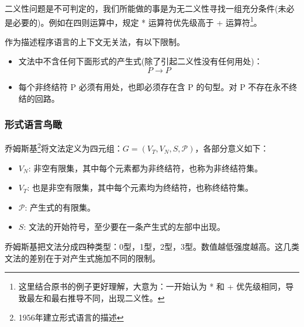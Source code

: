 二义性问题是不可判定的，我们所能做的事是为无二义性寻找一组充分条件(未必是必要的)。例如在四则运算中，规定 * 运算符优先级高于 + 运算符\footnote{这里结合原书的例子更好理解，大意为：一开始认为 * 和 + 优先级相同，导致最左和最右推导不同，出现二义性。}。

作为描述程序语言的上下文无关法，有以下限制。

\begin{itemize}
	\item 文法中不含任何下面形式的产生式(除了引起二义性没有任何用处)：
	      \[P \rightarrow P\]
	\item 每个非终结符 P 必须有用处，也即必须存在含 P 的句型。对 P 不存在永不终结的回路。
\end{itemize}

\subsubsection{形式语言鸟瞰}

乔姆斯基\footnote{1956年建立形式语言的描述}将文法定义为四元组：$G=(V_T,V_N,S,\mathcal{P})$，各部分意义如下：
\begin{itemize}
	\item $V_N$: 非空有限集，其中每个元素都为非终结符，也称为非终结符集。
	\item $V_T$: 也是非空有限集，其中每个元素均为终结符，也称终结符集。
	\item $\mathcal{P}$: 产生式的有限集。
	\item $S$: 文法的开始符号，至少要在一条产生式的左部中出现。
\end{itemize}

乔姆斯基把文法分成四种类型：0型，1型，2型，3型。数值越低强度越高。这几类文法的差别在于对产生式施加不同的限制。


